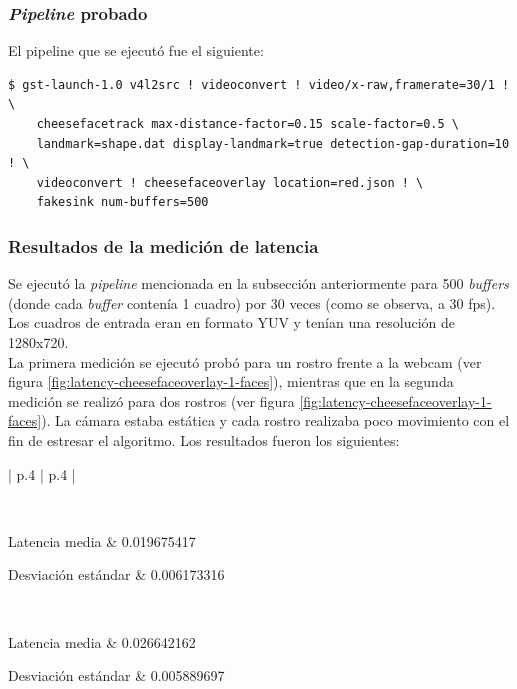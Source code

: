 \documentclass[a4paper,openright,12pt]{report}
\begin{document}
\subsubsection{\textit{Pipeline} probado}
El pipeline que se ejecutó fue el siguiente:
\begin{verbatim}
$ gst-launch-1.0 v4l2src ! videoconvert ! video/x-raw,framerate=30/1 ! \
    cheesefacetrack max-distance-factor=0.15 scale-factor=0.5 \
    landmark=shape.dat display-landmark=true detection-gap-duration=10 ! \
    videoconvert ! cheesefaceoverlay location=red.json ! \
    fakesink num-buffers=500
\end{verbatim}

\subsubsection{Resultados de la medición de latencia}
Se ejecutó la \textit{pipeline} mencionada en la subsección anteriormente para
500 \textit{buffers} (donde cada \textit{buffer} contenía 1 cuadro) por 30
veces (como se observa, a 30 fps). Los cuadros de entrada eran en formato YUV
y tenían una resolución de 1280x720.\\

La primera medición se ejecutó probó para un rostro frente a la webcam (ver
figura \ref{fig:latency-cheesefaceoverlay-1-faces}), mientras
que en la segunda medición se realizó para dos rostros (ver figura
\ref{fig:latency-cheesefaceoverlay-1-faces}). La cámara estaba estática y cada
rostro realizaba poco movimiento con el fin de estresar el algoritmo. Los
resultados fueron los siguientes:\\

  \begin{center}
    \begin{longtable}{| p{.4\textwidth} | p{.4\textwidth} |}
    \hline

    \\ \hline

    Latencia media &
    0.019675417
    \\ \hline

    Desviación estándar &
    0.006173316
    \\ \hline

    \\ \hline

    Latencia media &
    0.026642162
    \\ \hline

    Desviación estándar &
    0.005889697
    \\ \hline

    \end{longtable}
  \end{center}
\end{document}
